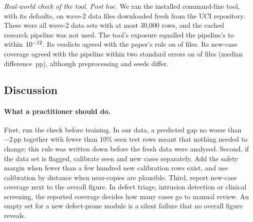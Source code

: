 \emph{Real-world check of the tool.} \emph{Post hoc.} We ran the installed command-line tool, with its defaults, on \NTvN{} wave-2 data files downloaded fresh from the UCI repository. These were all wave-2 data sets with at most 30,000 rows, and the cached research pipeline was not used. The tool's exposure equalled the pipeline's to within $10^{-12}$. Its verdicts agreed with the paper's rule on \NTvFlag{} of \NTvN{} files. Its new-case coverage agreed with the pipeline within two standard errors on \NTvFixTwose{} of \NTvN{} files (median difference \NTvMedFix{}\,pp), although preprocessing and seeds differ.


\subsection{Discussion}\label{sec:discussion}
\paragraph{What a practitioner should do.} First, run the check before training. In our data, a predicted gap no worse than $-2$\,pp together with fewer than 10\% seen test rows meant that nothing needed to change; this rule was written down before the fresh data were analysed. Second, if the data set is flagged, calibrate seen and new cases separately. Add the safety margin when fewer than a few hundred new calibration rows exist, and use calibration by distance when near-copies are plausible. Third, report new-case coverage next to the overall figure. In defect triage, intrusion detection or clinical screening, the reported coverage decides how many cases go to manual review. An empty set for a new defect-prone module is a silent failure that no overall figure reveals.

